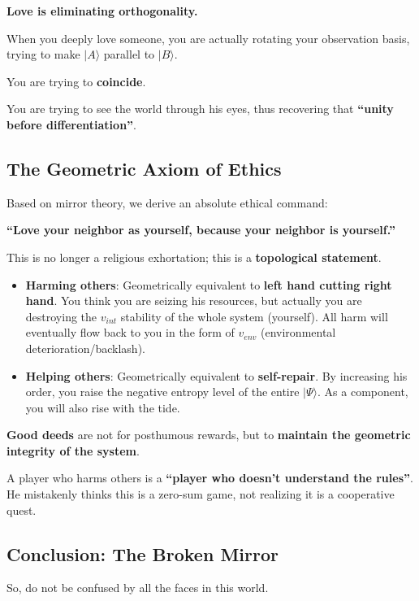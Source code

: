 \textbf{Love is eliminating orthogonality.}

When you deeply love someone, you are actually rotating your observation basis, trying to make $|A\rangle$ parallel to $|B\rangle$.

You are trying to \textbf{coincide}.

You are trying to see the world through his eyes, thus recovering that \textbf{``unity before differentiation''}.

\subsection{The Geometric Axiom of Ethics}

Based on mirror theory, we derive an absolute ethical command:

\textbf{``Love your neighbor as yourself, because your neighbor is yourself.''}

This is no longer a religious exhortation; this is a \textbf{topological statement}.

\begin{itemize}
\item \textbf{Harming others}: Geometrically equivalent to \textbf{left hand cutting right hand}. You think you are seizing his resources, but actually you are destroying the $v_{int}$ stability of the whole system (yourself). All harm will eventually flow back to you in the form of $v_{env}$ (environmental deterioration/backlash).

\item \textbf{Helping others}: Geometrically equivalent to \textbf{self-repair}. By increasing his order, you raise the negative entropy level of the entire $|\Psi\rangle$. As a component, you will also rise with the tide.
\end{itemize}

\textbf{Good deeds} are not for posthumous rewards, but to \textbf{maintain the geometric integrity of the system}.

A player who harms others is a \textbf{``player who doesn't understand the rules''}. He mistakenly thinks this is a zero-sum game, not realizing it is a cooperative quest.

\subsection{Conclusion: The Broken Mirror}

So, do not be confused by all the faces in this world.

